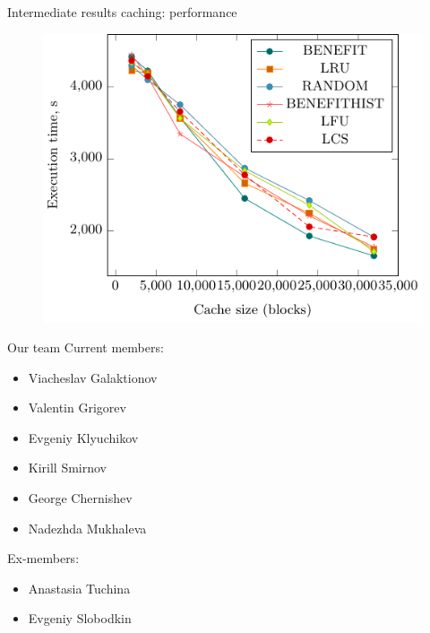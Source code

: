 \documentclass[compress, dvipsnames, unicode]{beamer}
\begin{document}
\begin{frame}{Intermediate results caching: performance}
    \begin{figure}
        \centering
        \includegraphics[width=.89\textwidth]{images/caching_performance.pdf}
    \end{figure}
\end{frame}



\begin{frame}{Our team}
Current members:

\begin{itemize}
    \item Viacheslav Galaktionov
    \item Valentin Grigorev
    \item Evgeniy Klyuchikov
    \item Kirill Smirnov
    \item George Chernishev
    \item Nadezhda Mukhaleva
\end{itemize}

Ex-members:

\begin{itemize}
    \item Anastasia Tuchina
    \item Evgeniy Slobodkin
\end{itemize}

\end{frame}
\end{document}
